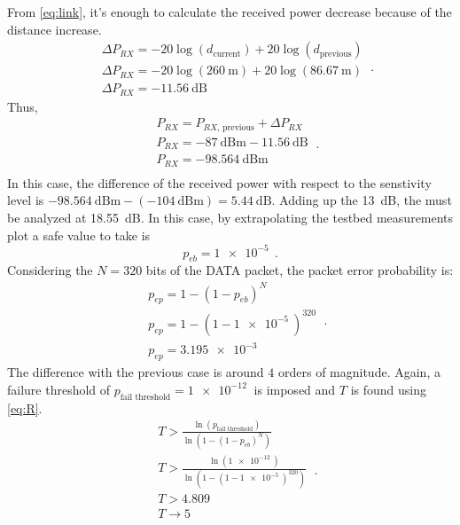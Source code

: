From \eqref{eq:link}, it's enough to calculate the received power decrease because of the distance increase.
\begin{equation}
	\begin{split}
	&	\Delta P_{RX} = - 20 \log \left( d_{\text{current}} \right)  + 20 \log \left( d_{\text{previous}} \right)  \\
	&	\Delta P_{RX} = - 20 \log \left( \SI{260}{\m} \right)  + 20 \log \left( \SI{86.67}{\m} \right)  \\
	&	\Delta P_{RX} = - \SI{11.56}{\dB}
	\end{split} \ .
\end{equation}
Thus,
\begin{equation}
	\begin{split}
		& P_{RX} = P_{RX \text{, previous}} + \Delta P_{RX} \\
		& P_{RX} = - \SI{87}{\dB}\text{m} - \SI{11.56}{\dB} \\
		& P_{RX} = - \SI{98.564}{\dB}\text{m} \\
	\end{split} \ .
\end{equation}
In this case, the difference of the received power with respect to the senstivity level is $\SI{-98.564}{\dB}\text{m} - \left( - \SI{104}{\dB}\text{m} \right) = \SI{5.44}{\dB}$. Adding up the \SI{13}{\dB}, the  must be analyzed at \SI{18.55}{\dB}. In this case, by extrapolating the testbed measurements plot a safe value to take is
\begin{equation}
	p_{eb} = \SI{1e-5}{} \ .
\end{equation}
Considering the $N = 320$ bits of the DATA packet, the packet error probability is:
\begin{equation}
	\begin{split}
		& p_{ep} = 1 - \left( 1 - p_{eb} \right)^N \\
		& p_{ep} = 1 - \left( 1 - \SI{1e-5}{} \right)^{320} \\
		& p_{ep} = \SI{3.195e-3}{}
	\end{split} \ .
\end{equation}
The difference with the previous case is around $4$ orders of magnitude. Again, a failure threshold of $p_{\text{fail threshold}} = \SI{1e-12}{}$ is imposed and $T$ is found using \eqref{eq:R}.
\begin{equation}
	\begin{split}
		& T > \frac{\ln \left( p_{\text{fail threshold}}  \right) }{\ln \left( 1 - \left( 1 - p_{eb} \right)^N \right) } \\
		& T > \frac{\ln \left( \SI{1e-12}{} \right) }{\ln \left( 1 - \left( 1 - \SI{1e-5}{} \right)^{320} \right) } \\
		& T > 4.809 \\
		& T \rightarrow 5 \\
	\end{split} \ .
\end{equation}

